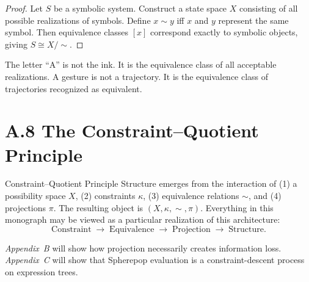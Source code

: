 \begin{proof}
  Let $S$ be a symbolic system. Construct a state space $X$ consisting of
  all possible realizations of symbols. Define $x \sim y$ iff $x$ and $y$
  represent the same symbol. Then equivalence classes $[x]$ correspond
  exactly to symbolic objects, giving $S \cong X/{\sim}$.
\end{proof}

\begin{remark}
  The letter ``A'' is not the ink. It is the equivalence class of all
  acceptable realizations. A gesture is not a trajectory. It is the
  equivalence class of trajectories recognized as equivalent.
\end{remark}

\section*{A.8 The Constraint–Quotient Principle}

\begin{namedthm}{Constraint–Quotient Principle}
  Structure emerges from the interaction of (1) a possibility space $X$,
  (2) constraints $\kappa$, (3) equivalence relations $\sim$, and
  (4) projections $\pi$. The resulting object is $(X, \kappa, \sim, \pi)$.
  Everything in this monograph may be viewed as a particular realization
  of this architecture:
  \[
    \text{Constraint}
    \;\to\;
    \text{Equivalence}
    \;\to\;
    \text{Projection}
    \;\to\;
    \text{Structure.}
  \]
\end{namedthm}

\medskip
\noindent
\textit{Appendix~B} will show how projection necessarily creates information
loss. \textit{Appendix~C} will show that Spherepop evaluation is a
constraint-descent process on expression trees.
